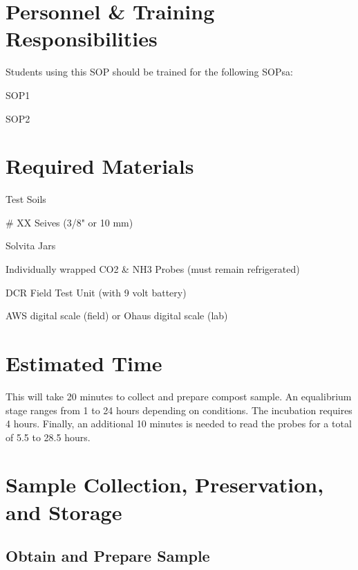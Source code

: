\documentclass[12pt]{../SOP4_alpha}\usepackage[]{graphicx}\usepackage[]{xcolor}
\begin{document}


\section{Personnel \& Training Responsibilities}


Students using this SOP should be trained for the following SOPsa:

\begin{itemize*}
  \item SOP1
  \item SOP2
\end{itemize*}

\section{Required Materials}

\begin{itemize*}
  \item Test Soils
  \item \# XX Seives (3/8" or 10 mm)
  \item Solvita Jars
  \item Individually wrapped CO2 \& NH3 Probes (must remain refrigerated) 
  \item DCR Field Test Unit (with 9 volt battery)
  \item AWS digital scale (field) or Ohaus digital scale (lab)
\end{itemize*}

\section{Estimated Time}

\NP This will take 20 minutes to collect and prepare compost sample. An equalibrium stage ranges from 1 to 24 hours depending on conditions. The incubation requires 4 hours. Finally, an additional 10 minutes is needed to read the probes for a total of 5.5 to 28.5 hours.

\section{Sample Collection, Preservation, and Storage}

\subsection{Obtain and Prepare Sample}
\end{document}
